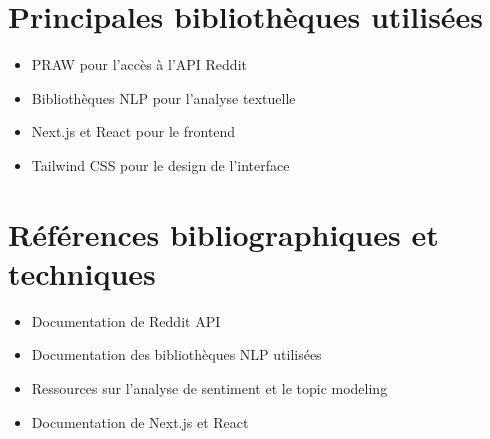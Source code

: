 \documentclass[12pt,a4paper]{report}
\begin{document}
\section{Principales bibliothèques utilisées}
\begin{itemize}
    \item PRAW pour l'accès à l'API Reddit
    \item Bibliothèques NLP pour l'analyse textuelle
    \item Next.js et React pour le frontend
    \item Tailwind CSS pour le design de l'interface
\end{itemize}

\section{Références bibliographiques et techniques}
\begin{itemize}
    \item Documentation de Reddit API
    \item Documentation des bibliothèques NLP utilisées
    \item Ressources sur l'analyse de sentiment et le topic modeling
    \item Documentation de Next.js et React
\end{itemize}

\vspace{1cm}
\end{document}
